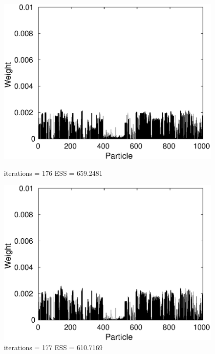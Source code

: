 \documentclass[12pt]{article}
\begin{document}
\begin{figure}[h!]
\centering
	\begin{minipage}{0.5\textwidth}
		\centering
		\includegraphics[scale = 0.5]{./Figures/176.eps}
		\caption*{iterations = 176 ESS = 659.2481}
	\end{minipage}%
	\begin{minipage}{0.5\textwidth}
		\centering
		\includegraphics[scale = 0.5]{./Figures/177.eps}
		\caption*{iterations = 177 ESS = 610.7169}
	\end{minipage}
	\begin{minipage}{0.5\textwidth}
		\centering

\end{minipage}
\end{figure}
\end{document}

